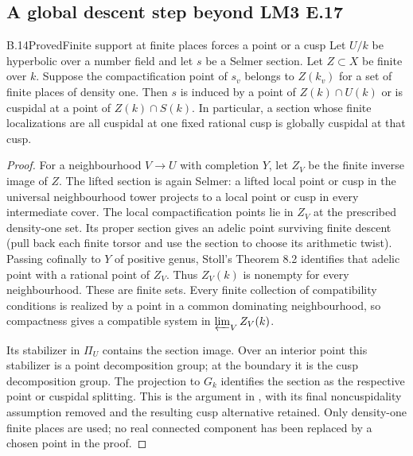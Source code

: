 \subsection{A global descent step beyond LM3 E.17}

\begin{statement}{B.14}{Proved}{Finite support at finite places forces a point or a cusp}
Let $U/k$ be hyperbolic over a number field and let $s$ be a Selmer
section.  Let $Z\subset X$ be finite over $k$.  Suppose the
compactification point of $s_v$ belongs to $Z(k_v)$ for a set of
finite places of density one.  Then $s$ is induced by a point of
$Z(k)\cap U(k)$ or is cuspidal at a point of $Z(k)\cap S(k)$.
In particular, a section whose finite localizations are all
cuspidal at one fixed rational cusp is globally cuspidal at that cusp.
\end{statement}
\begin{proof}
For a neighbourhood $V\to U$ with completion $Y$, let $Z_V$ be the
finite inverse image of $Z$.  The lifted section is again Selmer:
a lifted local point or cusp in the universal neighbourhood tower
projects to a local point or cusp in every intermediate cover.
The local compactification points lie in $Z_V$ at the prescribed
density-one set.  Its proper section gives an adelic point surviving
finite descent (pull back each finite torsor and use the section to
choose its arithmetic twist).  Passing cofinally to $Y$ of positive
genus, Stoll's Theorem 8.2 \cite{B_Stoll} identifies that adelic point
with a rational point of $Z_V$.  Thus $Z_V(k)$ is nonempty for every
neighbourhood.  These are finite sets.  Every finite collection of
compatibility conditions is realized by a point in a common
dominating neighbourhood, so compactness gives a compatible system
in $\varprojlim_V Z_V(k)$.

Its stabilizer in $\Pi_U$ contains the section image.  Over an
interior point this stabilizer is a point decomposition group; at
the boundary it is the cusp decomposition group.  The projection
to $G_k$ identifies the section as the respective point or
cuspidal splitting.  This is the argument in
\cite[\S3, proof of Corollary 5]{B_StixLocal}, with its final
noncuspidality assumption removed and the resulting cusp alternative
retained.  Only density-one finite places are used; no real
connected component has been replaced by a chosen point in the proof.
\end{proof}

